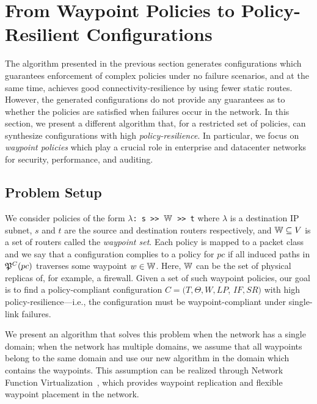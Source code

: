 \section{From Waypoint Policies to Policy-Resilient Configurations}
\label{sec:waypointres}
The algorithm presented in the previous section generates configurations 
which guarantees enforcement of complex policies under 
no failure scenarios, and at the same time, achieves good
connectivity-resilience by using fewer static routes.
However, the generated configurations do not provide
any guarantees as to whether the policies are satisfied when
failures occur in the network.
In this section, we present a different algorithm that, for a restricted set of policies,
can synthesize configurations with high \emph{policy-resilience}.
In particular, we focus on \emph{waypoint policies}
which play a crucial role in enterprise and
datacenter networks for security, performance,  
and auditing.

\subsection{Problem Setup}

We consider policies of the form 
\texttt{$\lambda$: s >> $\mathbb{W}$ >> t}
where $\lambda$ is a destination IP subnet,  
$s$ and $t$ are the source and destination routers respectively, 
and $\mathbb{W} \subseteq V$ is a set of routers called the \emph{waypoint set}. 
Each policy is mapped to a packet class and
we say that a configuration complies to a policy for $pc$ if 
all induced paths in $\mathfrak{P}^C(pc)$ 
traverses some waypoint $w \in \mathbb{W}$.
Here, $\mathbb{W}$
can be the set of physical replicas of,  for example, a firewall.
Given a set of such waypoint policies, our goal is to
find a policy-compliant configuration 
$C=(T,\Theta,W,LP$, $IF,SR)$ 
with high policy-resilience---i.e., the configuration
must be waypoint-compliant under single-link failures. 

We present an algorithm
that solves this problem when the network 
has a single domain;
when the network has multiple domains, 
we assume that all waypoints
belong to the same domain and
use our new algorithm in the domain 
which contains the waypoints.  
This assumption can be realized
through Network Function Virtualization~\cite{opennf, netbricks},
which provides waypoint replication and 
 flexible waypoint placement in the network.



